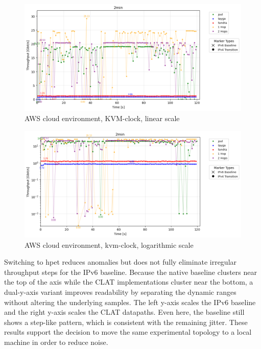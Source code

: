 \begin{figure}[H]
    \centering
    \includegraphics[width=1\textwidth]{resources/finalPlots/combinedplots/AWS_tcp_sameScale_kvm-clock_2min_linear.png}
    \caption{AWS cloud environment, KVM-clock, linear scale}
    \label{fig:AWS_tcp_sameScale_kvm-clock_linear}

\end{figure}
\begin{figure}[H]
    \centering
    \includegraphics[width=1\textwidth]{resources/finalPlots/combinedplots/AWS_tcp_sameScale_kvm-clock_2min_log.png}
    \caption{AWS cloud environment, kvm-clock, logarithmic scale}
    \label{fig:AWS_tcp_sameScale_kvm-clock_log}

\end{figure}

Switching to hpet reduces anomalies but does not fully eliminate irregular throughput steps for the IPv6 baseline. Because the native baseline clusters near the top of the axis while the CLAT implementations cluster near the bottom, a dual-y-axis variant improves readability by separating the dynamic ranges without altering the underlying samples. The left y-axis scales the IPv6 baseline and the right y-axis scales the CLAT datapaths. Even here, the baseline still shows a step-like pattern, which is consistent with the remaining jitter. These results support the decision to move the same experimental topology to a local machine in order to reduce noise. 


